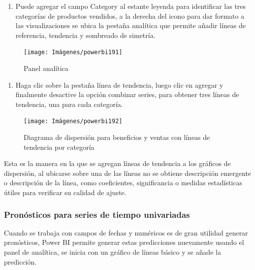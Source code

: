 \documentclass[
]{book}
\providecommand{\tightlist}{%
  \setlength{\itemsep}{0pt}\setlength{\parskip}{0pt}}
\begin{document}
\begin{enumerate}
\def\labelenumi{\arabic{enumi}.}
\setcounter{enumi}{4}
\tightlist
\item
  Puede agregar el campo Category al estante leyenda para identificar las tres categorías de productos vendidos, a la derecha del icono para dar formato a las visualizaciones se ubica la pestaña analítica que permite añadir líneas de referencia, tendencia y sombreado de simetría.
\end{enumerate}

\begin{figure}

{\centering \texttt{[image: Imágenes/powerbi191]} 

}

\caption{Panel analítica}\label{fig:paso5dispersionpowerbi-fig}
\end{figure}

\begin{enumerate}
\def\labelenumi{\arabic{enumi}.}
\setcounter{enumi}{5}
\tightlist
\item
  Haga clic sobre la pestaña línea de tendencia, luego clic en agregar y finalmente desactive la opción combinar series, para obtener tres líneas de tendencia, una para cada categoría.
\end{enumerate}

\begin{figure}

{\centering \texttt{[image: Imágenes/powerbi192]} 

}

\caption{Diagrama de dispersión para beneficios y ventas con líneas de tendencia por categoría}\label{fig:paso6dispersionpowerbi-fig}
\end{figure}

Esta es la manera en la que se agregan líneas de tendencia a los gráficos de dispersión, al ubicarse sobre una de las líneas no se obtiene descripción emergente o descripción de la línea, como coeficientes, significancia o medidas estadísticas útiles para verificar su calidad de ajuste.

\hypertarget{pronuxf3sticos-para-series-de-tiempo-univariadas-1}{%
\subsubsection{Pronósticos para series de tiempo univariadas}\label{pronuxf3sticos-para-series-de-tiempo-univariadas-1}}

Cuando se trabaja con campos de fechas y numéricos es de gran utilidad generar pronósticos, Power BI permite generar estas predicciones nuevamente usando el panel de analítica, se inicia con un gráfico de líneas básico y se añade la predicción.
\end{document}
